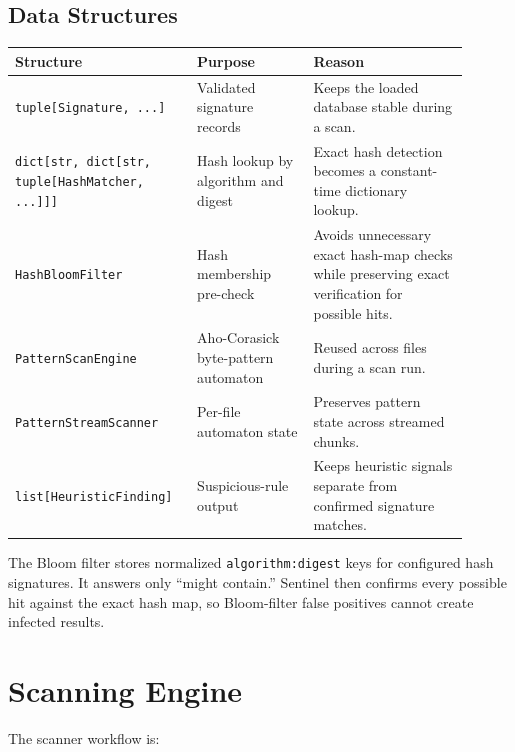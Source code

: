 \documentclass[11pt]{article}
\begin{document}
\subsection{Data Structures}

\begin{longtable}{p{0.34\linewidth}p{0.24\linewidth}p{0.32\linewidth}}
\toprule
\textbf{Structure} & \textbf{Purpose} & \textbf{Reason} \\
\midrule
\texttt{tuple[Signature, ...]} & Validated signature records &
Keeps the loaded database stable during a scan. \\
\texttt{dict[str, dict[str, tuple[HashMatcher, ...]]]} & Hash lookup by
algorithm and digest & Exact hash detection becomes a constant-time dictionary
lookup. \\
\texttt{HashBloomFilter} & Hash membership pre-check & Avoids unnecessary exact
hash-map checks while preserving exact verification for possible hits. \\
\texttt{PatternScanEngine} & Aho-Corasick byte-pattern automaton & Reused across
files during a scan run. \\
\texttt{PatternStreamScanner} & Per-file automaton state & Preserves pattern
state across streamed chunks. \\
\texttt{list[HeuristicFinding]} & Suspicious-rule output & Keeps heuristic
signals separate from confirmed signature matches. \\
\bottomrule
\end{longtable}

The Bloom filter stores normalized \texttt{algorithm:digest} keys for configured
hash signatures. It answers only ``might contain.'' Sentinel then confirms every
possible hit against the exact hash map, so Bloom-filter false positives cannot
create infected results.

\section{Scanning Engine}

The scanner workflow is:
\end{document}

